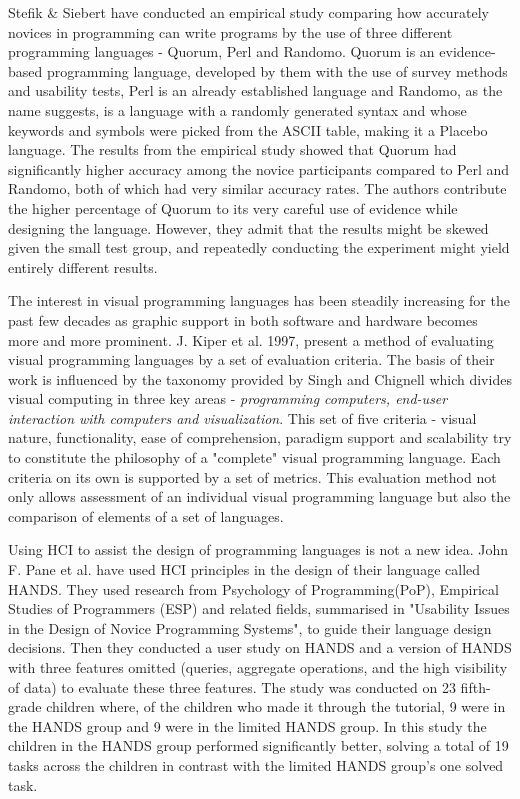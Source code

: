 Stefik \& Siebert \cite{QuorumRandomo} have conducted an empirical study comparing how accurately novices in programming can write programs by the use of three different programming languages - Quorum, Perl and Randomo. Quorum is an evidence-based programming language, developed by them with the use of survey methods and usability tests, Perl is an already established language and Randomo, as the name suggests, is a language with a randomly generated syntax and whose keywords and symbols were picked from the ASCII table, making it a Placebo language. The results from the empirical study showed that Quorum had significantly higher accuracy among the novice participants compared to Perl and Randomo, both of which had very similar accuracy rates. The authors contribute the higher percentage of Quorum to its very careful use of evidence while designing the language. However, they admit that the results might be skewed given the small test group, and repeatedly conducting the experiment might yield entirely different results.

The interest in visual programming languages has been steadily increasing for the past few decades as graphic support in both software and hardware becomes more and more prominent. J. Kiper et al. \cite{VisualLangsEval} 1997, present a method of evaluating visual programming languages by a set of evaluation criteria. The basis of their work is influenced by the taxonomy provided by Singh and Chignell \cite{VisualComputer} which divides visual computing in three key areas - \textit{programming computers, end-user interaction with computers and visualization}. This set of five criteria - visual nature, functionality, ease of comprehension, paradigm support and scalability try to constitute the philosophy of a "complete" visual programming language. Each criteria on its own is supported by a set of metrics. This evaluation method not only allows assessment of an individual visual programming language but also the comparison of elements of a set of languages.

Using HCI to assist the design of programming languages is not a new idea.
John F. Pane et al. \cite{HANDS} have used HCI principles in the design of their language called HANDS.
They used research from Psychology of Programming(PoP), Empirical Studies of Programmers (ESP) and related fields, summarised in "Usability Issues in the Design of Novice Programming Systems"\cite{UsabilityNoviceProgramming}, to guide their language design decisions.
Then they conducted a user study on HANDS and a version of HANDS with three features omitted (queries, aggregate operations, and the high visibility of data) to evaluate these three features.
The study was conducted on 23 fifth-grade children where, of the children who made it through the tutorial, 9 were in the HANDS group and 9 were in the limited HANDS group.
In this study the children in the HANDS group performed significantly better, solving a total of 19 tasks across the children in contrast with the limited HANDS group's one solved task.